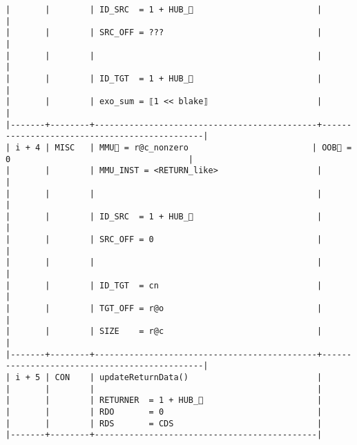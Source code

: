 \documentclass[varwidth=\maxdimen,margin=0.5cm,multi={verbatim}]{standalone}
\begin{document}
\begin{verbatim}
|       |        | ID_SRC  = 1 + HUB_                         |                                              |
|       |        | SRC_OFF = ???                               |                                              |
|       |        |                                             |                                              |
|       |        | ID_TGT  = 1 + HUB_                         |                                              |
|       |        | exo_sum = ⟦1 << blake⟧                      |                                              |
|-------+--------+---------------------------------------------+----------------------------------------------|
| i + 4 | MISC   | MMU🏴 = r@c_nonzero                         | OOB🏴 = 0                                    |
|       |        | MMU_INST = <RETURN_like>                    |                                              |
|       |        |                                             |                                              |
|       |        | ID_SRC  = 1 + HUB_                         |                                              |
|       |        | SRC_OFF = 0                                 |                                              |
|       |        |                                             |                                              |
|       |        | ID_TGT  = cn                                |                                              |
|       |        | TGT_OFF = r@o                               |                                              |
|       |        | SIZE    = r@c                               |                                              |
|-------+--------+---------------------------------------------+----------------------------------------------|
| i + 5 | CON    | updateReturnData()                          |
|       |        |                                             |
|       |        | RETURNER  = 1 + HUB_                       |
|       |        | RDO       = 0                               |
|       |        | RDS       = CDS                             |
|-------+--------+---------------------------------------------|
\end{verbatim}
\end{document}
